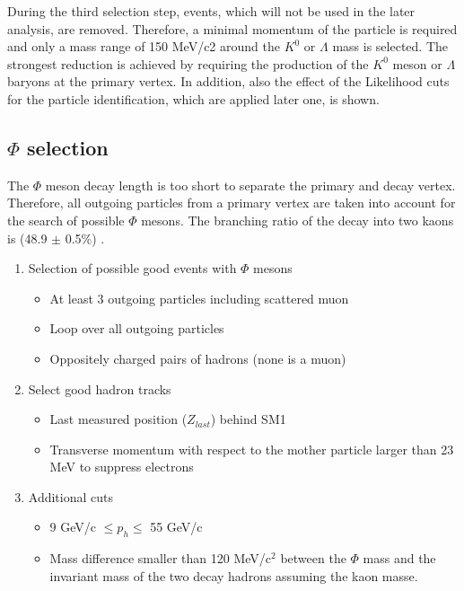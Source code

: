 During the third selection step, events, which will not be used in the later analysis, are removed. Therefore, a minimal momentum of the particle is required and only a mass range of 150 MeV/c2 around the $K^0$ or $\Lambda$ mass is selected. The strongest reduction is achieved by requiring the production of the $K^0$ meson or $\Lambda$ baryons at the primary vertex.
In addition, also the effect of the Likelihood cuts for the particle identification, which are applied later one, is shown.

\subsection{$\Phi$ selection}

The $\Phi$ meson decay length is too short to separate the primary and decay vertex. Therefore, all outgoing particles from a primary vertex are taken into account for the search of possible $\Phi$ mesons. The branching ratio of the decay into two kaons is (48.9 $\pm$ 0.5\%) \cite{}.

\begin{enumerate}
  \item Selection of possible good events with $\Phi$ mesons
  \begin{itemize}
    \item At least 3 outgoing particles including scattered muon
    \item Loop over all outgoing particles
    \item Oppositely charged pairs of hadrons (none is a muon)
  \end{itemize}
  \item Select good hadron tracks
  \begin{itemize}
    \item Last measured position ($Z_{last}$) behind SM1
    \item Transverse momentum with respect to the mother particle larger than 23 MeV to suppress electrons
  \end{itemize}
  \item Additional cuts
  \begin{itemize}
    \item 9 GeV/c $\leq p_h \leq$ 55 GeV/c
    \item Mass difference smaller than 120 MeV/c$^2$ between the $\Phi$ mass and the invariant mass of the two decay hadrons assuming the kaon masse.
  \end{itemize}
\end{enumerate}

